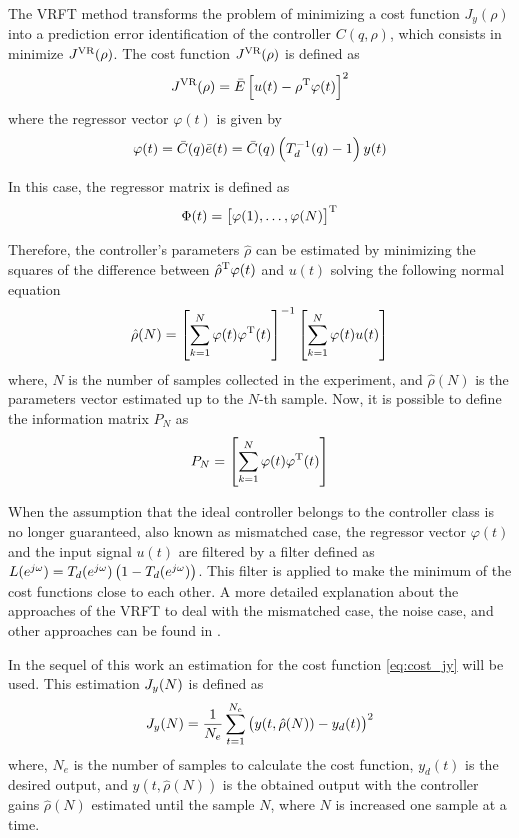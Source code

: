 The VRFT method transforms the problem of minimizing a cost function $J_y(\rho)$ into a prediction error identification of the controller $C(q, \rho)$, which consists in minimize $J^\text{VR}(\rho)$.
The cost function $J^\text{VR}(\rho)$ is defined as
\[
	J^\text{VR}(\rho) = \bar{E} \left[ u(t) - \rho^\text{T} \varphi(t) \right]^2
\]
where the regressor vector $\varphi(t)$ is given by
\begin{equation}
	\varphi(t) = \bar{C}(q)\bar{e}(t) = \bar{C}(q) \left( T_d^{-1}(q) -1 \right)y(t)
\label{eq:reg_vector_vrft}
\end{equation}

In this case, the regressor matrix is defined as
\begin{equation}
	\Phi(t) = \left[ \varphi(1), \ldots, \varphi(N) \right]^\text{T}
\label{eq:reg_mat_vrft}
\end{equation}

Therefore, the controller's parameters $\hat{\rho}$ can be estimated by minimizing the squares of the difference between $\hat{\rho}^\text{T} \varphi(t)$ and $u(t)$ solving the following normal equation
\begin{equation}
	\hat{\rho}(N) = \left[ \sum \limits_{k=1}^N \varphi(t) \varphi^\text{T}(t) \right]^{-1} \left[\sum \limits_{k=1}^N \varphi(t) u(t) \right] \label{eq:rho_idealcase}
\end{equation}
where, $N$ is the number of samples collected in the experiment, and $\hat{\rho}(N)$ is the parameters vector estimated up to the $N$-th sample.
Now, it is possible to define the information matrix $P_N$ as
\begin{equation}
	P_N = \left[ \sum \limits_{k=1}^N \varphi(t) \varphi^\text{T}(t) \right]
\label{eq:inf_mat_vrft}
\end{equation}

When the assumption that the ideal controller belongs to the controller class is no longer guaranteed, also known as mismatched case, the regressor vector $\varphi(t)$ and the input signal $u(t)$ are filtered by a filter defined as $L(e^{j\omega}) = T_d(e^{j\omega}) \left( 1- T_d(e^{j\omega}) \right)$.
This filter is applied to make the minimum of the cost functions close to each other.
A more detailed explanation about the approaches of the VRFT to deal with the mismatched case, the noise case, and other approaches can be found in \cite{bazanella2011data}.

In the sequel of this work an estimation for the cost function \eqref{eq:cost_jy} will be used.
This estimation $J_y(N)$ is defined as
\begin{equation}
	J_y(N) = \frac{1}{N_e} \sum \limits_{t=1}^{N_e} \left( y(t, \hat{\rho}(N)) - y_d(t) \right)^2
\label{eq:jy}
\end{equation}
where, $N_e$ is the number of samples to calculate the cost function, $y_d(t)$ is the desired output, and $y(t, \hat{\rho}(N))$ is the obtained output with the controller gains $\hat{\rho}(N)$ estimated until the sample $N$, where $N$ is increased one sample at a time.


